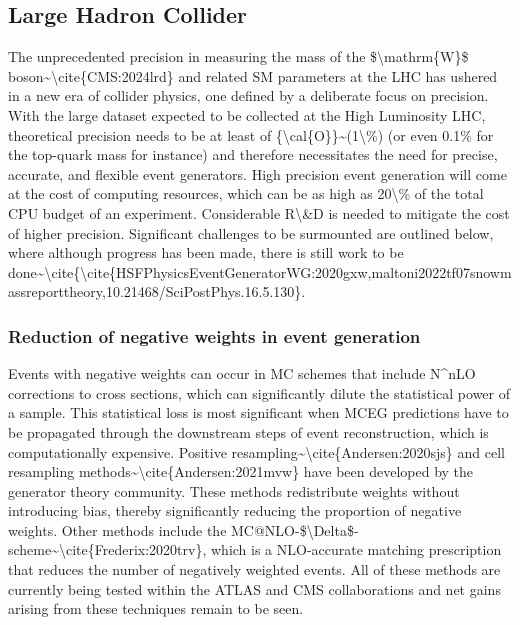 \subsection{Large Hadron Collider}\label{large-hadron-collider}

The unprecedented precision in measuring the mass of the
\$\textbackslash mathrm\{W\}\$
boson\textasciitilde\textbackslash cite\{CMS:2024lrd\} and related SM
parameters at the LHC has ushered in a new era of collider physics, one
defined by a deliberate focus on precision. With the large dataset
expected to be collected at the High Luminosity LHC, theoretical
precision needs to be at least of
\{\textbackslash cal\{O\}\}\textasciitilde(1\textbackslash\%) (or even
0.1\% for the top-quark mass for instance) and therefore necessitates
the need for precise, accurate, and flexible event generators. High
precision event generation will come at the cost of computing resources,
which can be as high as 20\textbackslash\% of the total CPU budget of an
experiment. Considerable R\textbackslash\&D is needed to mitigate the
cost of higher precision. Significant challenges to be surmounted are
outlined below, where although progress has been made, there is still
work to be
done\textasciitilde\textbackslash cite\{\textbackslash cite\{HSFPhysicsEventGeneratorWG:2020gxw,maltoni2022tf07snowmassreporttheory,10.21468/SciPostPhys.16.5.130\}.

\subsubsection{Reduction of negative weights in event
generation}\label{reduction-of-negative-weights-in-event-generation}

Events with negative weights can occur in MC schemes that include
N\^{}nLO corrections to cross sections, which can significantly dilute
the statistical power of a sample. This statistical loss is most
significant when MCEG predictions have to be propagated through the
downstream steps of event reconstruction, which is computationally
expensive. Positive
resampling\textasciitilde\textbackslash cite\{Andersen:2020sjs\} and
cell resampling
methods\textasciitilde\textbackslash cite\{Andersen:2021mvw\} have been
developed by the generator theory community. These methods redistribute
weights without introducing bias, thereby significantly reducing the
proportion of negative weights. Other methods include the
MC@NLO-\$\textbackslash Delta\$-scheme\textasciitilde\textbackslash cite\{Frederix:2020trv\},
which is a NLO-accurate matching prescription that reduces the number of
negatively weighted events. All of these methods are currently being
tested within the ATLAS and CMS collaborations and net gains arising
from these techniques remain to be seen.

